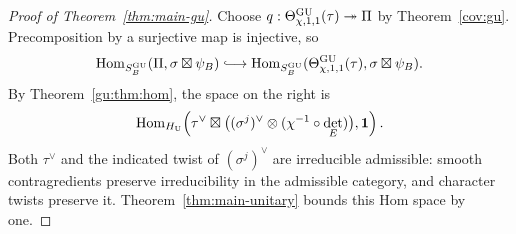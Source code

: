 \begin{proof}[Proof of Theorem~\ref{thm:main-gu}]
Choose $q:\Theta^{\operatorname{GU}}_{\chi,1,1}(\tau)\twoheadrightarrow\Pi$ by
Theorem~\ref{cov:gu}. Precomposition by a surjective map is injective,
so
\[
 \Hom_{S_B^{\GU}}(\Pi,\sigma\boxtimes\psi_B)
 \lhook\joinrel\longrightarrow
 \Hom_{S_B^{\GU}}(\Theta^{\GU}_{\chi,1,1}(\tau),
                                  \sigma\boxtimes\psi_B).
\]
By Theorem~\ref{gu:thm:hom}, the space on the right is
\[
 \operatorname{Hom}_{H_{\mathrm U}}\!\left(
   \tau^\vee\boxtimes
   \bigl((\sigma^j)^\vee\otimes(\chi^{-1}\circ\det_E)\bigr),
   \mathbf1\right).
\]
Both $\tau^\vee$ and the indicated twist of $(\sigma^j)^\vee$ are irreducible admissible: smooth
contragredients preserve irreducibility in the admissible category,
and character twists preserve it. Theorem~\ref{thm:main-unitary} bounds this Hom space by one.
\end{proof}

